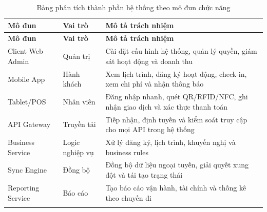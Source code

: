 \begin{longtable}{|p{2.8cm}|p{3.2cm}|p{7.2cm}|}
    \hline
    \textbf{Mô đun} & \textbf{Vai trò} & \textbf{Mô tả trách nhiệm} \\ \hline
    \endfirsthead
    \hline
    \textbf{Mô đun} & \textbf{Vai trò} & \textbf{Mô tả trách nhiệm} \\ \hline
    \endhead
    Client Web Admin & Quản trị & Cài đặt cấu hình hệ thống, quản lý quyền, giám sát hoạt động và doanh thu \\ \hline
    Mobile App & Hành khách & Xem lịch trình, đăng ký hoạt động, check-in, xem chi phí và nhận thông báo \\ \hline
    Tablet/POS & Nhân viên & Đăng nhập nhanh, quét QR/RFID/NFC, ghi nhận giao dịch và xác thực thanh toán \\ \hline
    API Gateway & Truyền tải & Tiếp nhận, định tuyến và kiểm soát truy cập cho mọi API trong hệ thống \\ \hline
    Business Service & Logic nghiệp vụ & Xử lý đăng ký, lịch trình, khuyến nghị và business rules \\ \hline
    Sync Engine & Đồng bộ & Đồng bộ dữ liệu ngoại tuyến, giải quyết xung đột và tái tạo trạng thái \\ \hline
    Reporting Service & Báo cáo & Tạo báo cáo vận hành, tài chính và thống kê theo chuyến đi \\ \hline
    \caption{Bảng phân tích thành phần hệ thống theo mô đun chức năng}
\end{longtable}
\FloatBarrier
